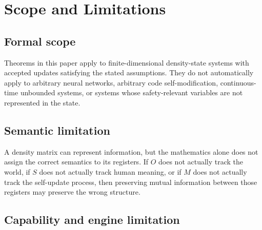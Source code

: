 \documentclass[11pt]{article}
\newcommand{\1}{\mathbf{1}}
\begin{document}
\section{Scope and Limitations}

\subsection{Formal scope}

Theorems in this paper apply to finite-dimensional density-state systems with accepted updates satisfying the stated assumptions. They do not automatically apply to arbitrary neural networks, arbitrary code self-modification, continuous-time unbounded systems, or systems whose safety-relevant variables are not represented in the state.

\subsection{Semantic limitation}

A density matrix can represent information, but the mathematics alone does not assign the correct semantics to its registers. If \(O\) does not actually track the world, if \(S\) does not actually track human meaning, or if \(M\) does not actually track the self-update process, then preserving mutual information between those registers may preserve the wrong structure.

\subsection{Capability and engine limitation}
\end{document}
